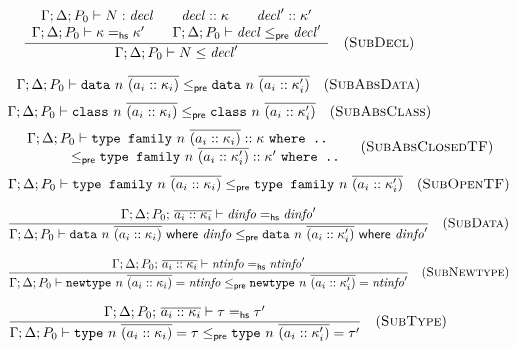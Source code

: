 \begin{figure}


\[
\frac{
\begin{array}{c}
\Gamma; \Delta; P_0 \vdash N : \mathit{decl} \qquad
\mathit{decl} :: \kappa \qquad
\mathit{decl}' :: \kappa' \\
\Gamma; \Delta; P_0 \vdash \kappa =_\mathsf{hs} \kappa' \qquad
\Gamma; \Delta; P_0 \vdash \mathit{decl} \le_\textsf{pre} \mathit{decl}'
\end{array}
}{
\Gamma; \Delta; P_0 \vdash N \le \mathit{decl}'
}
\quad(\textsc{SubDecl})
\]


\[
\Gamma; \Delta; P_0 \vdash \texttt{data}~n~\overline{(a_i :: \kappa_i)} \le_\textsf{pre} \texttt{data}~n~\overline{(a_i :: \kappa'_i)}
\quad(\textsc{SubAbsData})
\]
\[
\Gamma; \Delta; P_0 \vdash \texttt{class}~n~\overline{(a_i :: \kappa_i)} \le_\textsf{pre} \texttt{class}~n~\overline{(a_i :: \kappa'_i)}
\quad(\textsc{SubAbsClass})
\]
\[
\begin{array}{c}
\Gamma; \Delta; P_0 \vdash \texttt{type family}~n~\overline{(a_i :: \kappa_i)} :: \kappa ~\texttt{where ..} \\
\qquad\qquad\le_\textsf{pre} \texttt{type family}~n~\overline{(a_i :: \kappa'_i)} :: \kappa' ~\texttt{where ..}
\end{array}
\quad(\textsc{SubAbsClosedTF})
\]
\[
\Gamma; \Delta; P_0 \vdash \texttt{type family}~n~\overline{(a_i :: \kappa_i)} \le_\textsf{pre} \texttt{type family}~n~\overline{(a_i :: \kappa'_i)}
\quad(\textsc{SubOpenTF})
\]


\[
\frac{
\Gamma; \Delta; P_0;\, \overline{a_i :: \kappa_i} \vdash \mathit{dinfo} =_\textsf{hs} \mathit{dinfo}'
}{
\Gamma; \Delta; P_0 \vdash \texttt{data}~n~\overline{(a_i :: \kappa_i)} ~\textsf{where}~ \mathit{dinfo} \le_\textsf{pre} \texttt{data}~n~\overline{(a_i :: \kappa'_i)} ~\textsf{where}~ \mathit{dinfo}'
}
\quad(\textsc{SubData})
\]

\[
\frac{
\Gamma; \Delta; P_0;\, \overline{a_i :: \kappa_i} \vdash \mathit{ntinfo} =_\textsf{hs} \mathit{ntinfo}'
}{
\Gamma; \Delta; P_0 \vdash \texttt{newtype}~n~\overline{(a_i :: \kappa_i)} = \mathit{ntinfo} \le_\textsf{pre} \texttt{newtype}~n~\overline{(a_i :: \kappa'_i)} = \mathit{ntinfo}'
}
\quad(\textsc{SubNewtype})
\]

\[
\frac{
\Gamma; \Delta; P_0;\, \overline{a_i :: \kappa_i} \vdash \tau =_\textsf{hs} \tau'
}{
\Gamma; \Delta; P_0 \vdash \texttt{type}~n~\overline{(a_i :: \kappa_i)} = \tau \le_\textsf{pre} \texttt{type}~n~\overline{(a_i :: \kappa'_i)} = \tau'
}
\quad(\textsc{SubType})
\]


\end{figure}
